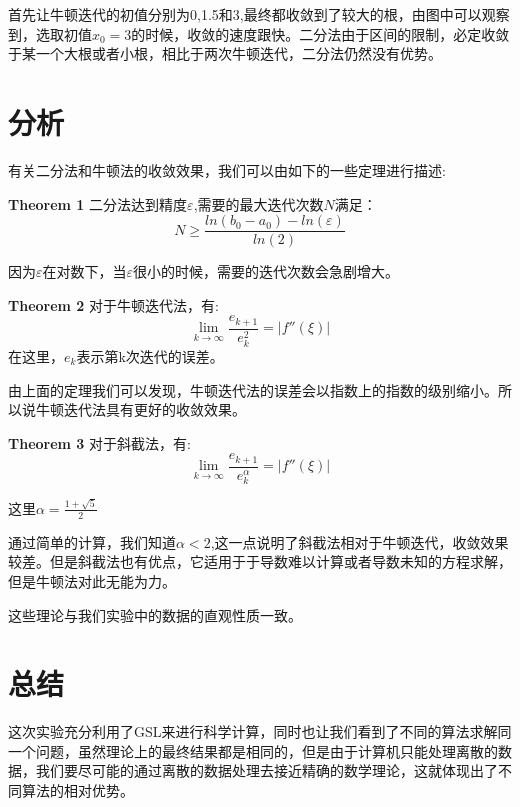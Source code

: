 \documentclass{ctexart}
\begin{document}
首先让牛顿迭代的初值分别为0,1.5和3,最终都收敛到了较大的根，由图中可以观察到，选取初值$x_0=3$的时候，收敛的速度跟快。二分法由于区间的限制，必定收敛于某一个大根或者小根，相比于两次牛顿迭代，二分法仍然没有优势。

\section{分析}
有关二分法和牛顿法的收敛效果，我们可以由如下的一些定理进行描述\cite{Ehiwario2014Comparative}:

\textbf{Theorem 1}{} 二分法达到精度$\varepsilon$,需要的最大迭代次数$N$满足：
\begin{equation}
  N \ge \frac{ln(b_0-a_0)-ln(\varepsilon)}{ln(2)}
\end{equation}

因为$\varepsilon$在对数下，当$\varepsilon$很小的时候，需要的迭代次数会急剧增大。

\textbf{Theorem 2}{} 对于牛顿迭代法，有:
\begin{equation}
   \lim_{k \to \infty} \frac{e_{k+1}}{e_k^2} = |f''(\xi)|
\end{equation}
在这里，$e_k$表示第k次迭代的误差。\par
由上面的定理我们可以发现，牛顿迭代法的误差会以指数上的指数的级别缩小。所以说牛顿迭代法具有更好的收敛效果。\par
\textbf{Theorem 3}{} 对于斜截法，有:
\begin{equation}
   \lim_{k \to \infty} \frac{e_{k+1}}{e_k^{\alpha}} = |f''(\xi)|
\end{equation}\par
这里$\alpha=\frac{1+\sqrt{5}}{2}$

通过简单的计算，我们知道$\alpha < 2$,这一点说明了斜截法相对于牛顿迭代，收敛效果较差。但是斜截法也有优点，它适用于于导数难以计算或者导数未知的方程求解，但是牛顿法对此无能为力。\par
这些理论与我们实验中的数据的直观性质一致。
\section{总结}
这次实验充分利用了GSL来进行科学计算，同时也让我们看到了不同的算法求解同一个问题，虽然理论上的最终结果都是相同的，但是由于计算机只能处理离散的数据，我们要尽可能的通过离散的数据处理去接近精确的数学理论，这就体现出了不同算法的相对优势。



\end{document}
